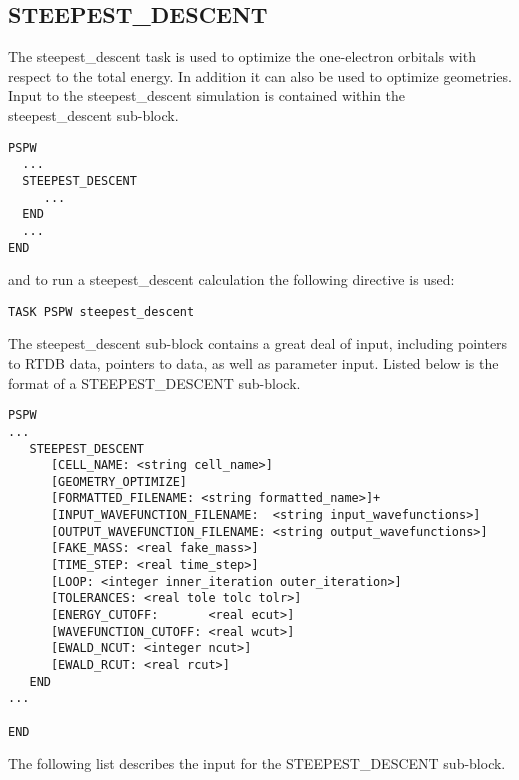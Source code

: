 \subsection{STEEPEST\_DESCENT} 
The steepest\_descent task is used to optimize the one-electron orbitals
with respect to the total energy.  In addition it can also be used to optimize
geometries.
Input to the steepest\_descent simulation is contained
within the steepest\_descent sub-block.
\begin{verbatim}
PSPW
  ...
  STEEPEST_DESCENT
     ...
  END
  ...
END
\end{verbatim}
and to run a steepest\_descent calculation the following directive is used:
\begin{verbatim}
TASK PSPW steepest_descent 
\end{verbatim}
The steepest\_descent sub-block contains a great deal
of input, including pointers to RTDB data, pointers to data, as well as
parameter input.  Listed below is the format of a STEEPEST\_DESCENT sub-block.
\begin{verbatim}
PSPW
...
   STEEPEST_DESCENT
      [CELL_NAME: <string cell_name>]
      [GEOMETRY_OPTIMIZE]
      [FORMATTED_FILENAME: <string formatted_name>]+
      [INPUT_WAVEFUNCTION_FILENAME:  <string input_wavefunctions>]
      [OUTPUT_WAVEFUNCTION_FILENAME: <string output_wavefunctions>]
      [FAKE_MASS: <real fake_mass>]
      [TIME_STEP: <real time_step>]
      [LOOP: <integer inner_iteration outer_iteration>]
      [TOLERANCES: <real tole tolc tolr>]
      [ENERGY_CUTOFF:       <real ecut>]
      [WAVEFUNCTION_CUTOFF: <real wcut>]
      [EWALD_NCUT: <integer ncut>]
      [EWALD_RCUT: <real rcut>]
   END
...

END
\end{verbatim}
The following list describes the input for the STEEPEST\_DESCENT
sub-block.

